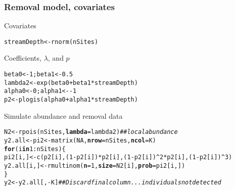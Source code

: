 \documentclass[color=usenames,dvipsnames]{beamer}\usepackage[]{graphicx}\usepackage[]{xcolor}
\makeatletter
\newcommand{\hlnum}[1]{\textcolor[rgb]{0.69,0.494,0}{#1}}%
\newcommand{\hlcom}[1]{\textcolor[rgb]{0.514,0.506,0.514}{\textit{#1}}}%
\newcommand{\hlopt}[1]{\textcolor[rgb]{0,0,0}{#1}}%
\newcommand{\hldef}[1]{\textcolor[rgb]{0,0,0}{#1}}%
\newcommand{\hlkwa}[1]{\textcolor[rgb]{0,0,0}{\textbf{#1}}}%
\newcommand{\hlkwb}[1]{\textcolor[rgb]{0,0.341,0.682}{#1}}%
\newcommand{\hlkwc}[1]{\textcolor[rgb]{0,0,0}{\textbf{#1}}}%
\newcommand{\hlkwd}[1]{\textcolor[rgb]{0.004,0.004,0.506}{#1}}%
\newenvironment{kframe}{%
 \def\at@end@of@kframe{}%
 \ifinner\ifhmode%
  \def\at@end@of@kframe{\end{minipage}}%
  \begin{minipage}{\columnwidth}%
 \fi\fi%
 \def\FrameCommand##1{\hskip\@totalleftmargin \hskip-\fboxsep
 \colorbox{shadecolor}{##1}\hskip-\fboxsep
     \hskip-\linewidth \hskip-\@totalleftmargin \hskip\columnwidth}%
 \MakeFramed {\advance\hsize-\width
   \@totalleftmargin\z@ \linewidth\hsize
   \@setminipage}}%
 {\par\unskip\endMakeFramed%
 \at@end@of@kframe}
\newenvironment{knitrout}{}{} %
\makeatother
\begin{document}
\begin{frame}[fragile]
  \frametitle{Removal model, covariates}
  \small
  Covariates
  \vspace{-6pt}
\begin{knitrout}\scriptsize
{}\color{fgcolor}\begin{kframe}
\begin{alltt}
\hldef{streamDepth} \hlkwb{<-} \hlkwd{rnorm}\hldef{(nSites)}
\end{alltt}
\end{kframe}
\end{knitrout}
\vfill
  Coefficients, $\lambda$, and $p$
  \vspace{-6pt}
\begin{knitrout}\scriptsize
{}\color{fgcolor}\begin{kframe}
\begin{alltt}
\hldef{beta0} \hlkwb{<-} \hlnum{1}\hldef{; beta1} \hlkwb{<-} \hlnum{0.5}
\hldef{lambda2} \hlkwb{<-} \hlkwd{exp}\hldef{(beta0} \hlopt{+} \hldef{beta1}\hlopt{*}\hldef{streamDepth)}
\hldef{alpha0} \hlkwb{<-} \hlnum{0}\hldef{; alpha1} \hlkwb{<-} \hlopt{-}\hlnum{1}
\hldef{p2} \hlkwb{<-} \hlkwd{plogis}\hldef{(alpha0} \hlopt{+} \hldef{alpha1}\hlopt{*}\hldef{streamDepth)}
\end{alltt}
\end{kframe}
\end{knitrout}
\vfill
  Simulate abundance and removal data
  \vspace{-6pt}
\begin{knitrout}\scriptsize
{}\color{fgcolor}\begin{kframe}
\begin{alltt}
\hldef{N2} \hlkwb{<-} \hlkwd{rpois}\hldef{(nSites,} \hlkwc{lambda}\hldef{=lambda2)}         \hlcom{## local abundance }
\hldef{y2.all} \hlkwb{<-} \hldef{pi2} \hlkwb{<-} \hlkwd{matrix}\hldef{(}\hlnum{NA}\hldef{,} \hlkwc{nrow}\hldef{=nSites,} \hlkwc{ncol}\hldef{=K)}
\hlkwa{for}\hldef{(i} \hlkwa{in} \hlnum{1}\hlopt{:}\hldef{nSites) \{}
    \hldef{pi2[i,]} \hlkwb{<-} \hlkwd{c}\hldef{(p2[i], (}\hlnum{1}\hlopt{-}\hldef{p2[i])}\hlopt{*}\hldef{p2[i], (}\hlnum{1}\hlopt{-}\hldef{p2[i])}\hlopt{^}\hlnum{2}\hlopt{*}\hldef{p2[i], (}\hlnum{1}\hlopt{-}\hldef{p2[i])}\hlopt{^}\hlnum{3}\hldef{)}
    \hldef{y2.all[i,]} \hlkwb{<-} \hlkwd{rmultinom}\hldef{(}\hlkwc{n}\hldef{=}\hlnum{1}\hldef{,} \hlkwc{size}\hldef{=N2[i],} \hlkwc{prob}\hldef{=pi2[i,])}
\hldef{\}}
\hldef{y2} \hlkwb{<-} \hldef{y2.all[,}\hlopt{-}\hldef{K]} \hlcom{## Discard final column... individuals not detected}
\end{alltt}
\end{kframe}
\end{knitrout}
\end{frame}
\end{document}
